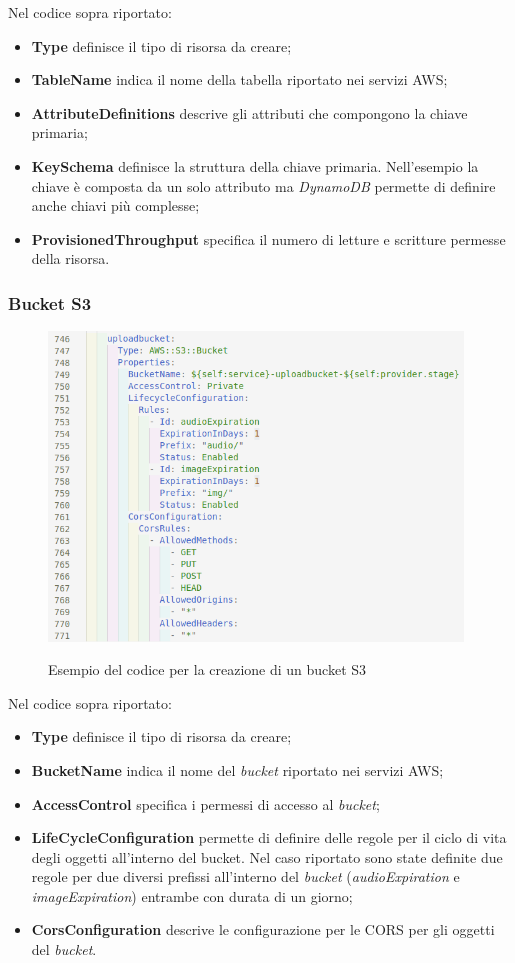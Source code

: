 		Nel codice sopra riportato:
		\begin{itemize}
			\item \textbf{Type} definisce il tipo di risorsa da creare;
			\item \textbf{TableName} indica il nome della tabella riportato nei servizi \gls{AWS};
			\item \textbf{AttributeDefinitions} descrive gli attributi che compongono la chiave primaria;
			\item \textbf{KeySchema} definisce la struttura della chiave primaria. Nell'esempio la chiave è composta da un solo attributo ma \emph{DynamoDB} permette di definire anche chiavi più complesse;
			\item \textbf{ProvisionedThroughput} specifica il numero di letture e scritture permesse della risorsa.
		\end{itemize}

		\subsubsection{Bucket S3} \label{subsec:bucketS3}
			
		\begin{figure}[H]
			\centering
			\includegraphics[width=11cm]{immagini/bucketS3.png} \\
			\caption{\label{fig:bucketS3} Esempio del codice per la creazione di un bucket S3}
		\end{figure}
	
		Nel codice sopra riportato:
		\begin{itemize}
			\item \textbf{Type} definisce il tipo di risorsa da creare;
			\item \textbf{BucketName} indica il nome del \emph{bucket} riportato nei servizi \gls{AWS};
			\item \textbf{AccessControl} specifica i permessi di accesso al \emph{bucket};
			\item \textbf{LifeCycleConfiguration} permette di definire delle regole per il ciclo di vita degli oggetti all'interno del bucket. Nel caso riportato sono state definite due regole per due diversi prefissi all'interno del \emph{bucket} (\emph{audioExpiration} e \emph{imageExpiration}) entrambe con durata di un giorno;
			\item \textbf{CorsConfiguration} descrive le configurazione per le \gls{CORS} per gli oggetti del \emph{bucket}.
		\end{itemize}
	
